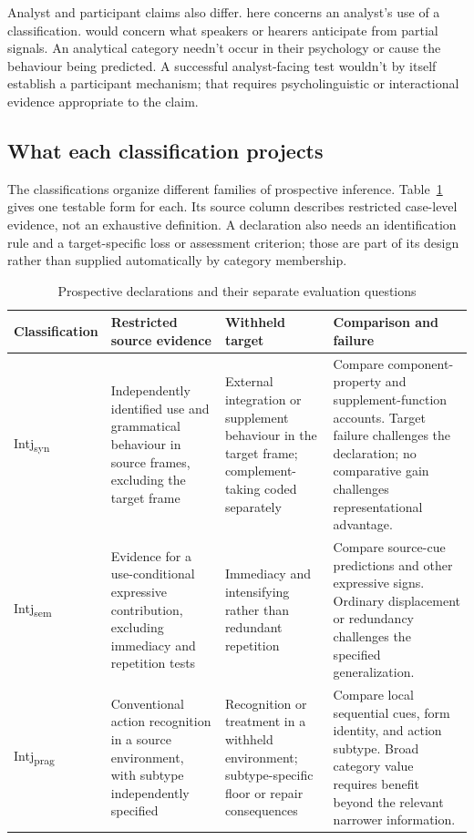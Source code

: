 \documentclass[12pt]{article}
\newcommand{\intjshort}[1]{Intj\textsubscript{#1}}
\begin{document}
Analyst and participant claims also differ.  here concerns an analyst's use of a classification.  would concern what speakers or hearers anticipate from partial signals. An analytical category needn't occur in their psychology or cause the behaviour being predicted. A successful analyst-facing test wouldn't by itself establish a participant mechanism; that requires psycholinguistic or interactional evidence appropriate to the claim.

\subsection{What each classification projects}\label{sec:proj-fieldrelative}

The classifications organize different families of prospective inference. Table~\ref{tab:declarations} gives one testable form for each. Its source column describes restricted case-level evidence, not an exhaustive definition. A declaration also needs an identification rule and a target-specific loss or assessment criterion; those are part of its design rather than supplied automatically by category membership.

\begin{table}[htbp]
\centering
\scriptsize
\caption{Prospective declarations and their separate evaluation questions}
\label{tab:declarations}
\begin{tabular}{@{}>{\raggedright\arraybackslash}p{}>{\raggedright\arraybackslash}p{}>{\raggedright\arraybackslash}p{}>{\raggedright\arraybackslash}p{}@{}}
\toprule
Classification & Restricted source evidence & Withheld target & Comparison and failure \\
\midrule
\intjshort{syn} & Independently identified use and grammatical behaviour in source frames, excluding the target frame & External integration or supplement behaviour in the target frame; complement-taking coded separately & Compare component-property and supplement-function accounts. Target failure challenges the declaration; no comparative gain challenges representational advantage. \\
\addlinespace
\intjshort{sem} & Evidence for a use-conditional expressive contribution, excluding immediacy and repetition tests & Immediacy and intensifying rather than redundant repetition \citep[167]{potts2007} & Compare source-cue predictions and other expressive signs. Ordinary displacement or redundancy challenges the specified generalization. \\
\addlinespace
\intjshort{prag} & Conventional action recognition in a source environment, with subtype independently specified & Recognition or treatment in a withheld environment; subtype-specific floor or repair consequences & Compare local sequential cues, form identity, and action subtype. Broad category value requires benefit beyond the relevant narrower information. \\
\bottomrule
\end{tabular}
\end{table}
\end{document}
